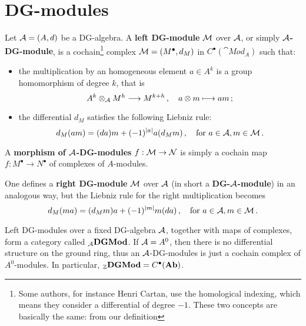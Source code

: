 \section{DG-modules}

	\begin{df}
		Let $\mathcal{A} = (A,d)$ be a DG-algebra.
		A \textbf{left DG-module} $\mathcal{M}$ over $\mathcal{A}$, or simply \textbf{$\mathcal{A}$-DG-module},
		is a cochain\footnote{Some authors, for instance Henri Cartan, use the homological indexing, which means they consider a differential of degree $-1$. These two concepts are basically the same: from our definition } 
		complex $\mathcal{M} = (M^{\bullet},d_{M})$ in $C^{\bullet}(\cat{Mod}_{A})$
		such that:
		\begin{itemize}
			\item the multiplication by an homogeneous element $a \in A^{k}$
			is a group homomorphism of degree $k$, that is
			\begin{equation*}
				A^{k} \otimes_{\mathcal{A}} M^{h} \longrightarrow M^{k+h}\,, \quad
				a \otimes m \longmapsto am\,;
			\end{equation*}
			
			\item the differential $d_{M}$ satisfies the following Liebniz rule:
			\begin{equation}\label{graded-mod-liebniz}
				d_{M}(am) = (da)m + (-1)^{|a|}a(d_{M}m)\,,
				\quad \text{for } a \in \mathcal{A}, m \in \mathcal{M}\,.
			\end{equation}
		\end{itemize}
		A \textbf{morphism of $\mathcal{A}$-DG-modules} $f:\mathcal{M} \to \mathcal{N}$
		is simply a cochain map $f:M^{\bullet} \to N^{\bullet}$
		of complexes of $A$-modules.
		
		One defines a \textbf{right DG-module} $\mathcal{M}$
		over $\mathcal{A}$ (in short a \textbf{DG-$\mathcal{A}$-module})
		in an analogous way, but the Liebniz rule for the
		right multiplication becomes
		\begin{equation*}
			d_{M}(ma) = (d_{M}m)a + (-1)^{|m|}m(da)\,,
			\quad \text{for } a \in \mathcal{A}, m \in \mathcal{M}\,.
		\end{equation*}
	\end{df}
	
	\begin{ex}
		Left DG-modules over a fixed DG-algebra $\mathcal{A}$, together with maps of complexes,
		form a category called ${}_{\mathcal{A}}{\normalfont\textbf{DGMod}}$. 
		If $\mathcal{A} = A^{0}$, then there is no differential structure
		on the ground ring, thus an $\mathcal{A}$-DG-modules is just a cochain complex of $A^{0}$-modules.
		In particular, ${}_{{\mathbb Z}}{\normalfont\textbf{DGMod}} = C^{\bullet}({\normalfont\textbf{Ab}})$.
	\end{ex}
	
